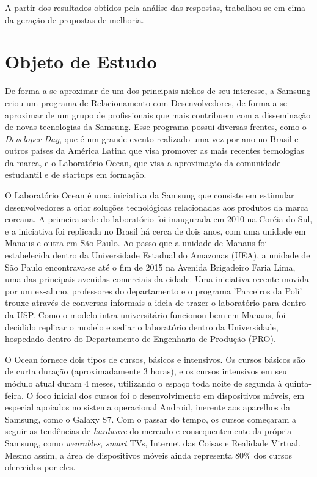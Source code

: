 A partir dos resultados obtidos pela análise das respostas, trabalhou-se em cima da geração de propostas de melhoria.

\section{Objeto de Estudo}

De forma a se aproximar de um dos principais nichos de seu interesse, a Samsung criou um programa de Relacionamento com Desenvolvedores, de forma a se aproximar de um grupo de profissionais que mais contribuem com a disseminação de novas tecnologias da Samsung. Esse programa possui diversas frentes, como o \textit{Developer Day}, que é um grande evento realizado uma vez por ano no Brasil e outros países da América Latina que visa promover as mais recentes tecnologias da marca, e o Laboratório Ocean, que visa a aproximação da comunidade estudantil e de startups em formação.

O Laboratório Ocean é uma iniciativa da Samsung que consiste em estimular desenvolvedores a criar soluções tecnológicas relacionadas aos produtos da marca coreana. A primeira sede do laboratório foi inaugurada em 2010 na Coréia do Sul, e a iniciativa foi replicada no Brasil há cerca de dois anos, com uma unidade em Manaus e outra em São Paulo. Ao passo que a unidade de Manaus foi estabelecida dentro da Universidade Estadual do Amazonas (UEA), a unidade de São Paulo encontrava-se até o fim de 2015 na Avenida Brigadeiro Faria Lima, uma das principais avenidas comerciais da cidade. Uma iniciativa recente movida por um ex-aluno, professores do departamento e o programa 'Parceiros da Poli' trouxe através de conversas informais a ideia de trazer o laboratório para dentro da USP. Como o modelo intra universitário funcionou bem em Manaus, foi decidido replicar o modelo e sediar o laboratório dentro da Universidade, hospedado dentro do Departamento de Engenharia de Produção (PRO).

O Ocean fornece dois tipos de cursos, básicos e intensivos. Os cursos básicos são de curta duração (aproximadamente 3 horas), e os cursos intensivos em seu módulo atual duram 4 meses, utilizando o espaço toda noite de segunda à quinta-feira. O foco inicial dos cursos foi o desenvolvimento em dispositivos móveis, em especial apoiados no sistema operacional Android, inerente aos aparelhos da Samsung, como o Galaxy S7. Com o passar do tempo, os cursos começaram a seguir as tendências de \textit{hardware} do mercado e consequentemente da própria Samsung, como \textit{wearables}, \textit{smart} TVs, Internet das Coisas e Realidade Virtual. Mesmo assim, a área de dispositivos móveis ainda representa 80\% dos cursos oferecidos por eles.

